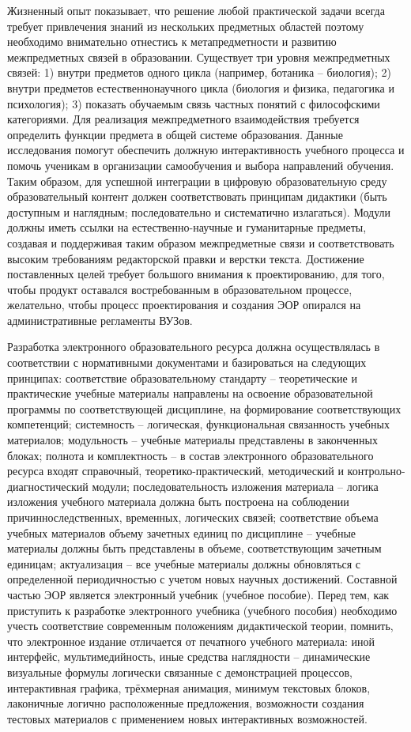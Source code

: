 Жизненный опыт показывает, что решение любой практической задачи всегда требует привлечения знаний из нескольких предметных областей поэтому необходимо внимательно отнестись к метапредметности и развитию межпредметных связей в образовании\cite{metapredmet}.
Существует три уровня межпредметных связей: 1) внутри предметов одного цикла (например, ботаника -- биология); 2) внутри предметов естественнонаучного цикла (биология и физика, педагогика и психология); 3) показать обучаемым связь частных понятий с философскими категориями.
Для реализация межпредметного взаимодействия требуется определить функции предмета в общей системе образования.
Данные исследования помогут обеспечить должную интерактивность учебного процесса и помочь ученикам в организации самообучения и выбора направлений обучения\cite{osobennosti_eor}.
Таким образом, для успешной интеграции в цифровую образовательную среду образовательный контент должен соответствовать принципам дидактики (быть доступным и наглядным; последовательно и систематично излагаться).
Модули должны иметь ссылки на естественно-научные и гуманитарные предметы, создавая и поддерживая таким образом межпредметные связи и соответствовать высоким требованиям редакторской правки и верстки текста.
Достижение поставленных целей требует большого внимания к проектированию, для того, чтобы продукт оставался востребованным в образовательном процессе, желательно, чтобы процесс проектирования и создания ЭОР опирался на административные регламенты ВУЗов.

Разработка электронного образовательного ресурса должна осуществлялась в соответствии с нормативными документами и базироваться на следующих принципах:
соответствие образовательному стандарту – теоретические и практические учебные материалы направлены на освоение образовательной программы по соответствующей дисциплине, на формирование соответствующих компетенций;
системность – логическая, функциональная связанность учебных материалов;
модульность – учебные материалы представлены в законченных блоках;
полнота и комплектность – в состав электронного образовательного ресурса входят справочный, теоретико-практический, методический и контрольно-диагностический модули;
последовательность изложения материала – логика изложения учебного материала должна быть построена на соблюдении причинноследственных, временных, логических связей;
соответствие объема учебных материалов объему зачетных единиц по дисциплине – учебные материалы должны быть представлены в объеме, соответствующим зачетным единицам;
актуализация – все учебные материалы должны обновляться с определенной периодичностью с учетом новых научных достижений.
Составной частью ЭОР является электронный учебник (учебное пособие).
Перед тем, как приступить к разработке электронного учебника (учебного пособия) необходимо учесть соответствие современным положениям дидактической теории, помнить, что электронное издание отличается от печатного учебного материала: иной интерфейс, мультимедийность, иные средства наглядности – динамические визуальные формулы логически связанные с демонстрацией процессов, интерактивная графика, трёхмерная анимация, минимум текстовых блоков, лаконичные логично расположенные предложения, возможности создания тестовых материалов с применением новых интерактивных возможностей\cite{7}.